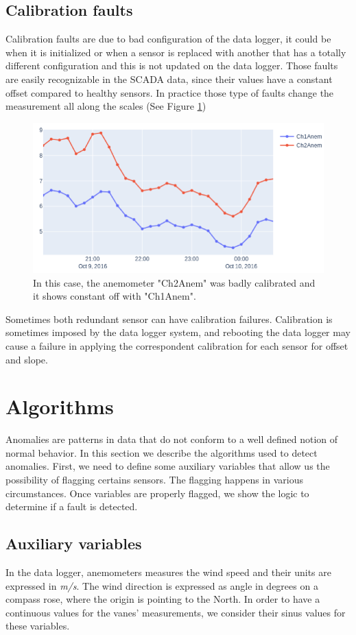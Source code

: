 \documentclass[conference]{IEEEtran}
\begin{document}
\subsection{Calibration faults} 
Calibration faults are due to bad configuration of the data logger, it could be when it is initialized or when a sensor is replaced with another that has a totally different configuration and this is not updated on the data logger. Those faults are easily recognizable in the SCADA data, since their values have a constant offset compared to healthy sensors. In practice those type of faults change the measurement all along the scales (See Figure \ref{fig:calibrationFaults})
\begin{figure}[h]
	\centering
	\includegraphics[width=\columnwidth]{Images/CalibrationFaults.png}
	\caption{In this case, the anemometer "Ch2Anem" was badly calibrated and it shows constant off with "Ch1Anem".}
	\label{fig:calibrationFaults}
\end{figure}
Sometimes both redundant sensor can have calibration failures.
Calibration is sometimes imposed by the data logger system, and rebooting the data logger may cause a failure in applying the correspondent calibration for each sensor for offset and slope.

\section{Algorithms}\label{sec:algorithms}
Anomalies are patterns in data that do not conform to a well defined notion of normal behavior. In this section we describe the algorithms used to detect anomalies. First, we need to define some auxiliary variables that allow us the possibility of flagging certains sensors. The flagging happens in various circumstances. Once variables are properly flagged, we show the logic to determine if a fault is detected.  
\subsection{Auxiliary variables}\label{subsec:computedvariables}
In the data logger, anemometers measures the wind speed and their units are expressed in \emph{m/s}. The wind direction is expressed as angle in degrees on a compass rose, where the origin is pointing to the North. In order to have a continuous values for the vanes' measurements, we consider their sinus values for these variables.
\end{document}
